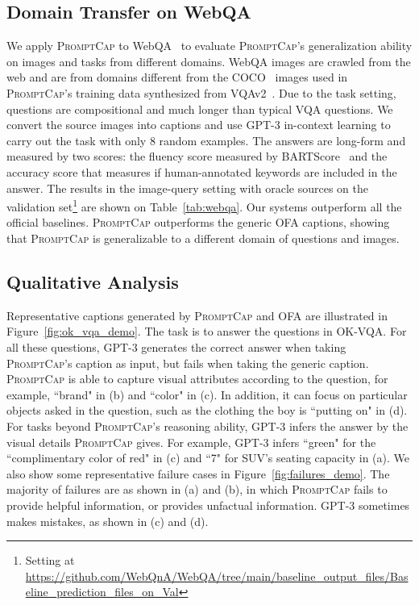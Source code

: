 \documentclass[10pt,twocolumn,letterpaper]{article}
\newcommand{\NAME}{\textsc{PromptCap}\xspace}
\begin{document}
\subsection{Domain Transfer on WebQA}
We apply \NAME to WebQA~\cite{chang2022webqa} to evaluate \NAME's generalization ability on images and tasks from different domains.
WebQA images are crawled from the web and are from domains different from the COCO~\cite{lin2014microsoft} images used in \NAME's training data synthesized from VQAv2~\cite{goyal2017making}.
Due to the task setting, questions are compositional and much longer than typical VQA questions.
We convert the source images into captions and use GPT-3 in-context learning to carry out the task with only 8 random examples.
The answers are long-form and measured by two scores: the fluency score measured by BARTScore~\cite{yuan2021bartscore} and the accuracy score that measures if human-annotated keywords are included in the answer.
The results in the image-query setting with oracle sources on the validation set\footnote{Setting at \url{https://github.com/WebQnA/WebQA/tree/main/baseline_output_files/Baseline_prediction_files_on_Val}}
are shown on Table~\ref{tab:webqa}.
Our systems outperform all the official baselines.
\NAME outperforms the generic OFA captions, showing that \NAME is generalizable to  a different domain of questions and images.











\subsection{Qualitative Analysis}
Representative captions generated by \NAME and OFA are illustrated in Figure~\ref{fig:ok_vqa_demo}. The task is to answer the questions in OK-VQA. For all these questions, GPT-3 generates the correct answer when taking \NAME's caption as input, but fails when taking the generic caption. \NAME is able to capture visual attributes according to the question, for example, ``brand" in (b) and ``color" in (c). In addition, it can focus on particular objects asked in the question, such as the clothing the boy is ``putting on" in (d). For tasks beyond \NAME's reasoning ability, GPT-3 infers the answer by the visual details \NAME gives. For example, GPT-3 infers ``green" for the ``complimentary color of red" in (c) and ``7" for SUV's seating capacity in (a).
We also show some representative failure cases in Figure~\ref{fig:failures_demo}. The majority of failures are as shown in (a) and (b), in which \NAME fails to provide helpful information, or provides unfactual information. GPT-3 sometimes makes mistakes, as shown in (c) and (d).
\end{document}
